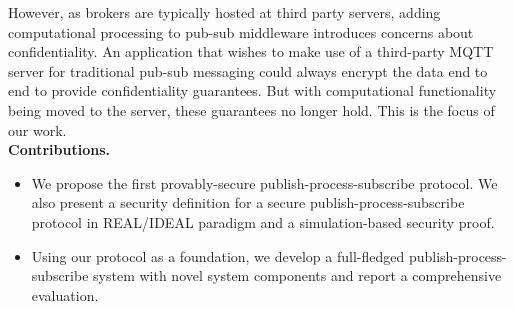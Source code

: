 However, as brokers are typically hosted at third party servers, adding
computational processing to pub-sub middleware  introduces concerns about
confidentiality. An application that wishes to make use of a third-party MQTT
server for traditional pub-sub messaging could always encrypt the data end to
end to provide confidentiality guarantees. But with computational functionality
being moved to the server, these guarantees no longer hold. This is the focus
of our work.\\[6pt]
\noindent\textbf{Contributions.}

\begin{itemize}[leftmargin=*]

	\item We propose the first provably-secure publish-process-subscribe
		protocol. We also present a security definition for a secure
		publish-process-subscribe protocol in REAL/IDEAL paradigm and a
		simulation-based security proof.

	\item Using our protocol as a foundation, we develop a full-fledged
		publish-process-subscribe system with novel system components and report a
		comprehensive evaluation.

\end{itemize}







